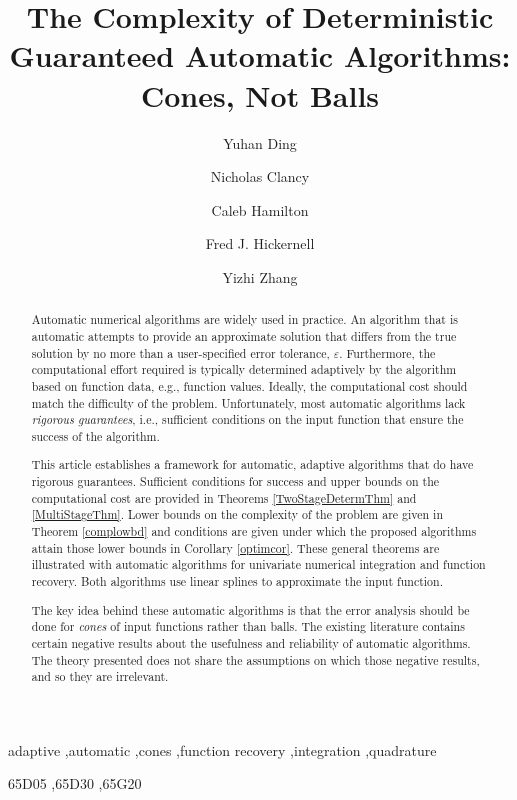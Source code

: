 \documentclass[]{elsarticle}
\theoremstyle{definition}
\theoremstyle{remark}
\begin{document}
\begin{frontmatter}

\title{The Complexity of Deterministic Guaranteed Automatic Algorithms:  Cones, Not Balls}
\author{Yuhan Ding}
\author{Nicholas Clancy}
\author{Caleb Hamilton}
\author{Fred J. Hickernell}
\author{Yizhi Zhang}
\address{Room E1-208, Department of Applied Mathematics, Illinois Institute of Technology,\\ 10 W.\ 32$^{\text{nd}}$ St., Chicago, IL 60616}
\begin{abstract} Automatic numerical algorithms are widely used in practice.  An algorithm that is automatic attempts to provide an approximate solution that differs from the true solution by no more than a user-specified error tolerance, $\varepsilon$. Furthermore, the computational effort required is typically determined adaptively by the algorithm based on function data, e.g., function values.  Ideally, the computational cost should match the difficulty of the problem.  Unfortunately, most automatic algorithms lack \emph{rigorous guarantees}, i.e., sufficient conditions on the input function that ensure the success of the algorithm. 

This article establishes a framework for automatic, adaptive algorithms that do have rigorous guarantees. Sufficient conditions for success and upper bounds on the computational cost are provided in Theorems \ref{TwoStageDetermThm} and \ref{MultiStageThm}.  Lower bounds on the complexity of the problem are given in Theorem \ref{complowbd} and conditions are given under which the proposed algorithms attain those lower bounds in Corollary \ref{optimcor}. These general theorems are illustrated with automatic algorithms for univariate numerical integration and function recovery.  Both algorithms use linear splines to approximate the input function.  

The key idea behind these automatic algorithms is that the error analysis should be done for \emph{cones} of input functions rather than balls. The existing literature contains certain negative results about the usefulness and reliability of automatic algorithms.  The theory presented does not share the assumptions on which those negative results, and so they are irrelevant.
\end{abstract}

\begin{keyword}
adaptive \sep automatic \sep cones \sep function recovery \sep integration \sep quadrature

\MSC[2010] 65D05 \sep 65D30 \sep 65G20

\end{keyword}
\end{frontmatter}
\end{document}
